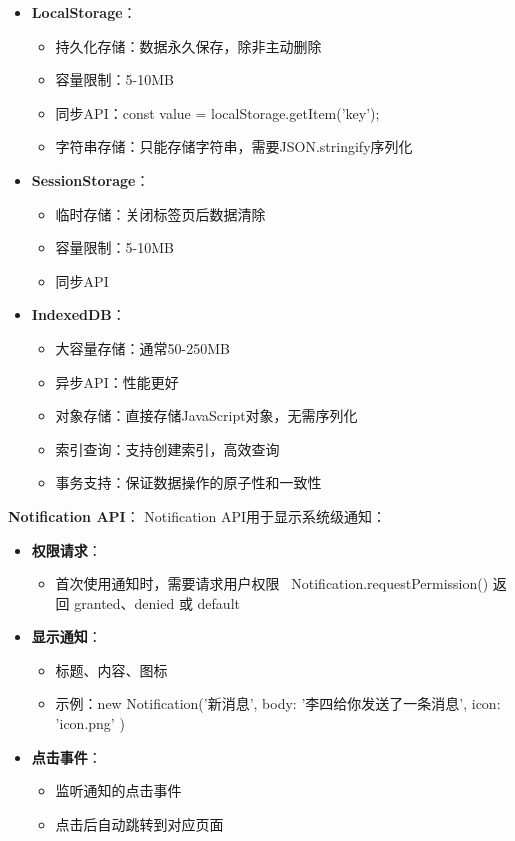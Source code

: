\documentclass[12pt,a4paper]{article}
\begin{document}
\begin{itemize}
    \item \textbf{LocalStorage}：
        \begin{itemize}
            \item 持久化存储：数据永久保存，除非主动删除
            \item 容量限制：5-10MB
            \item 同步API：const value = localStorage.getItem('key');
            \item 字符串存储：只能存储字符串，需要JSON.stringify序列化
        \end{itemize}
    \item \textbf{SessionStorage}：
        \begin{itemize}
            \item 临时存储：关闭标签页后数据清除
            \item 容量限制：5-10MB
            \item 同步API
        \end{itemize}
    \item \textbf{IndexedDB}：
        \begin{itemize}
            \item 大容量存储：通常50-250MB
            \item 异步API：性能更好
            \item 对象存储：直接存储JavaScript对象，无需序列化
            \item 索引查询：支持创建索引，高效查询
            \item 事务支持：保证数据操作的原子性和一致性
        \end{itemize}
\end{itemize}

\textbf{Notification API}：
Notification API用于显示系统级通知：

\begin{itemize}
    \item \textbf{权限请求}：
        \begin{itemize}
            \item 首次使用通知时，需要请求用户权限
            \ Notification.requestPermission() 返回 granted、denied 或 default
        \end{itemize}
    \item \textbf{显示通知}：
        \begin{itemize}
            \item 标题、内容、图标
            \item 示例：new Notification('新消息', { body: '李四给你发送了一条消息', icon: 'icon.png' })
        \end{itemize}
    \item \textbf{点击事件}：
        \begin{itemize}
            \item 监听通知的点击事件
            \item 点击后自动跳转到对应页面
        \end{itemize}
\end{itemize}
\end{document}
